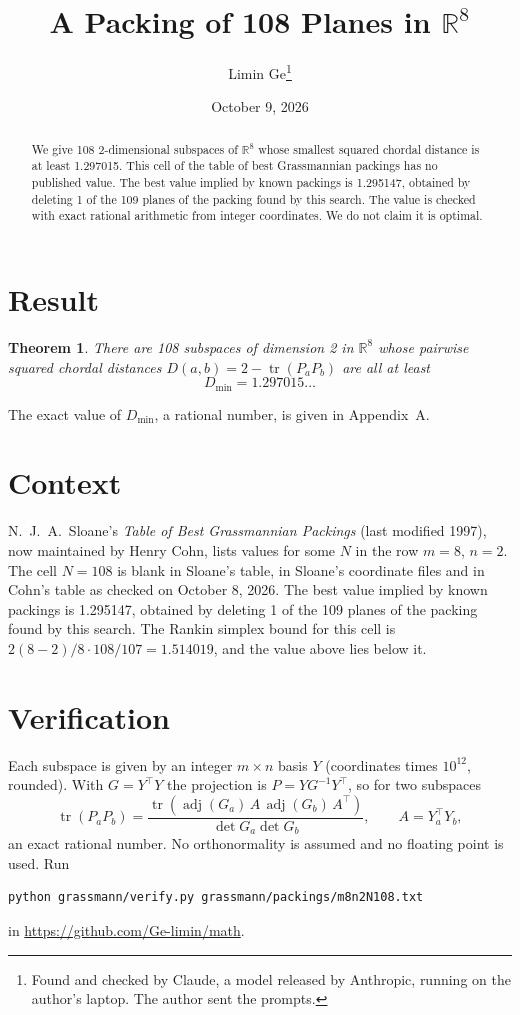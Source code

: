 \documentclass[11pt,a4paper]{article}
\title{A Packing of 108 Planes in $\mathbb{R}^{8}$}
\author{Limin Ge\thanks{Found and checked by Claude, a model released by Anthropic, running on the author's laptop. The author sent the prompts.}}
\date{October 9, 2026}
\newtheorem*{theorem}{Theorem}
\begin{document}
\maketitle
\begin{abstract}
We give 108 2-dimensional subspaces of $\mathbb{R}^{8}$ whose smallest squared chordal distance is at least 1.297015. This cell of the table of best Grassmannian packings has no published value. The best value implied by known packings is 1.295147, obtained by deleting 1 of the 109 planes of the packing found by this search. The value is checked with exact rational arithmetic from integer coordinates. We do not claim it is optimal.
\end{abstract}

\section{Result}
\begin{theorem}
There are 108 subspaces of dimension 2 in $\mathbb{R}^{8}$ whose pairwise squared chordal distances $D(a,b) = 2 - \operatorname{tr}(P_aP_b)$ are all at least
\[ D_{\min} = 1.297015\ldots \]
\end{theorem}
The exact value of $D_{\min}$, a rational number, is given in Appendix~A.


\section{Context}
N.~J.~A.~Sloane's \emph{Table of Best Grassmannian Packings} (last modified 1997), now maintained by Henry Cohn, lists values for some $N$ in the row $m=8$, $n=2$. The cell $N=108$ is blank in Sloane's table, in Sloane's coordinate files and in Cohn's table as checked on October 8, 2026. The best value implied by known packings is 1.295147, obtained by deleting 1 of the 109 planes of the packing found by this search. The Rankin simplex bound for this cell is $2(8-2)/8\cdot 108/107 = 1.514019$, and the value above lies below it.


\section{Verification}
Each subspace is given by an integer $m\times n$ basis $Y$ (coordinates times $10^{12}$, rounded). With $G=Y^\top Y$ the projection is $P=YG^{-1}Y^\top$, so for two subspaces
\[ \operatorname{tr}(P_aP_b)=\frac{\operatorname{tr}(\operatorname{adj}(G_a)\,A\,\operatorname{adj}(G_b)\,A^\top)}{\det G_a\det G_b},\qquad A=Y_a^\top Y_b, \]
an exact rational number. No orthonormality is assumed and no floating point is used. Run
\begin{verbatim}
python grassmann/verify.py grassmann/packings/m8n2N108.txt
\end{verbatim}
in \url{https://github.com/Ge-limin/math}.
\end{document}
